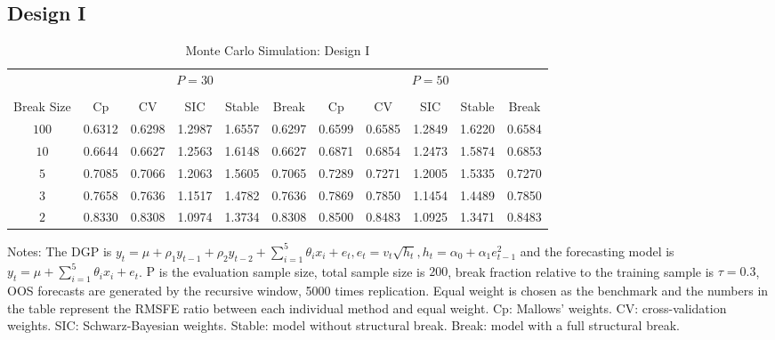 \subsection{Design I}
\begin{table}
    \caption{Monte Carlo Simulation: Design I} \label{ntb:1}
    \centering
    \begin{adjustbox}{width=\textwidth,totalheight=\textheight,keepaspectratio}
    \begin{threeparttable}
    \begin{tabular}{ccccccccccc}
    \toprule
     & \multicolumn{5}{c}{$P = 30$} & \multicolumn{5}{c}{$P = 50$} \\
    \cmidrule(r){2-6}
    \cmidrule(r){7-11} \\
      Break Size   & Cp     &   CV   & SIC    & Stable & Break  & Cp     & CV     & SIC    & Stable & Break \\
             $100$ & 0.6312 &0.6298  &1.2987  & 1.6557 &0.6297  & 0.6599 &0.6585  &1.2849  & 1.6220 &0.6584 \\
             $10$  & 0.6644 &0.6627  &1.2563  & 1.6148 &0.6627  & 0.6871 &0.6854  &1.2473  & 1.5874 &0.6853 \\
             $5$   & 0.7085 &0.7066  &1.2063  & 1.5605 &0.7065  & 0.7289 &0.7271  &1.2005  & 1.5335 &0.7270 \\
             $3$   & 0.7658 &0.7636  &1.1517  & 1.4782 &0.7636  & 0.7869 &0.7850  &1.1454  & 1.4489 &0.7850 \\
             $2$   & 0.8330 &0.8308  &1.0974  & 1.3734 &0.8308  & 0.8500 &0.8483  &1.0925  & 1.3471 &0.8483 \\
    \bottomrule
    \end{tabular}
    \begin{tablenotes} \footnotesize
    Notes: The DGP is $y_{t} = \mu + \rho_{1}y_{t-1} + \rho_{2}y_{t-2} + \sum_{i=1}^{5}\theta_{i}x_{i} + e_{t}, e_{t} = v_{t}\sqrt{h_{t}}, h_{t} = \alpha_{0} + \alpha_{1}e_{t-1}^2$ and the forecasting model is $y_{t} = \mu + \sum_{i=1}^{5}\theta_{i}x_{i} + e_{t}$. $\mathrm{P}$ is the evaluation sample size, total sample size is $200$, break fraction relative to the training sample is $\tau = 0.3$, OOS forecasts are generated by the recursive window, 5000 times replication. Equal weight is chosen as the benchmark and the numbers in the table represent the RMSFE ratio between each individual method and equal weight. Cp: Mallows' weights. CV: cross-validation weights. SIC: Schwarz-Bayesian weights. Stable: model without structural break. Break: model with a full structural break.
    \end{tablenotes}
    \end{threeparttable}
    \end{adjustbox}
\end{table}
